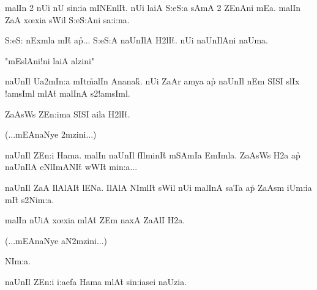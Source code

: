 ma\R{}lIn 2 nU\R{}i nU sin:ia mINEnlIt\h{}.  nU\R{}i laiA\R{} S:eS:a sAmA 2 ZEnAni\R{} mEa.  ma\R{}lIn ZaA\R{} x\oe{}xia sWil S:eS:Ani\R{} sa:i:na.

S:eS: nExmla mIt\h{} ap\h{}... S:eS:A\R{} naUnIlA\R{} H2\R{}lIt\h{}.  nU\R{}i naUnIlAni\R{} naUma.

"mEslAni!ni\R{} laiA\R{} alzini"

naUnIl Ua2mIn:a mIt\h ma\R{}lIn Ananak\h{}.  nU\R{}i ZaAr amy\R{}a ap\h{} naUnIl\R{} nEm\R{} SISI\R{} slIx\R{} !amsIml mlAt\h{} ma\R{}lInA\R{} s2!amsIml.

ZaAsWs ZEn:im\R{}a SISI\R{} aila\R{} H2\R{}lIt\h{}.

(...mEAnaNy\R{}e 2mzini...)

naUnIl ZEn:i\R{} Hama.  ma\R{}lIn naUnIl\R{} fIlminIt\h{} m\R{}SAmIa EmImla.  ZaAsWs H2\R{}a ap\h{} naUnIlA\R{} eNlImANIt\h{} w\R{}WIt\h{} min:a...

naUnIl ZaA\R{} IlAlAIt\h{} lENa.  IlAlA\R{} N\R{}ImlIt\h{} sWil nU\R{}i ma\R{}lInA\R{} saTa ap\h{} ZaAsm \R{}iUm:ia mIt\h{} s2N\R{}im:a.

ma\R{}lIn nU\R{}iA\R{} x\oe{}xia mlAt\h{} ZEm nax\R{}A ZaA\R{}lI H2\R{}a.

(...mEAnaNy\R{}e aN2mzini...)

N\R{}Im:a.

naUnIl ZEn:i\R{} i:aefa Hama mlAt\h{} sin:iasei naUzia.
